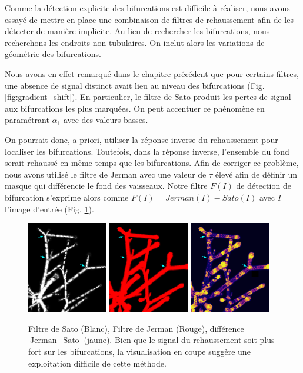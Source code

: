 Comme la détection explicite des bifurcations est difficile à réaliser, nous avons essayé de mettre en place une combinaison de filtres de rehaussement afin de les détecter de manière implicite. Au lieu de rechercher les bifurcations, nous recherchons les endroits non tubulaires. On inclut alors les variations de géométrie des bifurcations.

Nous avons en effet remarqué dans le chapitre précédent que pour certains filtres, une absence de signal distinct avait lieu au niveau des bifurcations (Fig. \ref{fig:gradient_shift}). En particulier, le filtre de Sato produit les pertes de signal aux bifurcations les plus marquées. On peut accentuer ce phénomène en paramétrant $\alpha_1$ avec des valeurs basses. 

On pourrait donc, a priori, utiliser la réponse inverse du rehaussement pour localiser les bifurcations. Toutefois, dans la réponse inverse, l'ensemble du fond serait rehaussé en même temps que les bifurcations. Afin de corriger ce problème, nous avons utilisé le filtre de Jerman avec une valeur de $\tau$ élevé afin de définir un masque qui différencie le fond des vaisseaux. Notre filtre $F(I)$ de détection de bifurcation s'exprime alors comme $F(I) = Jerman(I) - Sato(I)$ avec $I$ l'image d'entrée (Fig. \ref{fig:subtract_vesselness}). 

\begin{figure}[!ht]
    \centering
    \includegraphics[height=4cm]{Images/SatoFilter_bif.png}
    \includegraphics[height=4cm]{Images/JermanFilter_bif.png}
    \includegraphics[height=4cm]{Images/subJermanSato_bif.png}
    \caption{Filtre de Sato (Blanc), Filtre de Jerman (Rouge), différence $\textrm{Jerman}-\textrm{Sato}$ (jaune). Bien que le signal du rehaussement soit plus fort sur les bifurcations, la visualisation en coupe suggère une exploitation difficile de cette méthode.}
    \label{fig:subtract_vesselness}
\end{figure}

